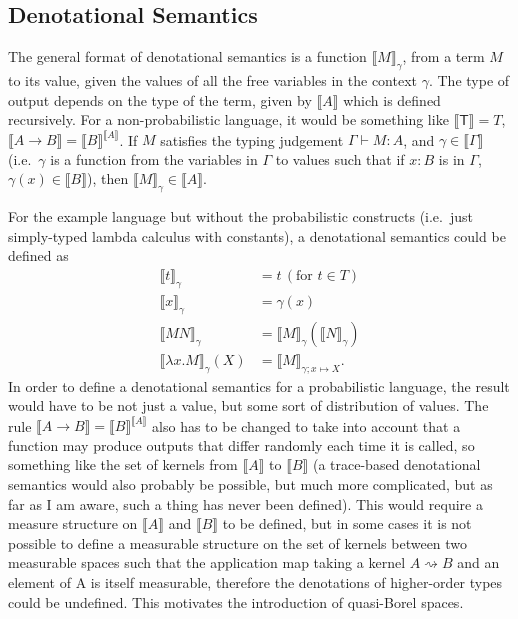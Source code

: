 \documentclass[titlepage]{article}
\newcommand{\denotation}[1]{\llbracket #1 \rrbracket}
\begin{document}
\subsection{Denotational Semantics}
The general format of denotational semantics is a function $\denotation M_\gamma$, from a term $M$ to its value, given the values of all the free variables in the context $\gamma$. The type of output depends on the type of the term, given by $\denotation A$ which is defined recursively. For a non-probabilistic language, it would be something like $\denotation{\mathsf T} = T$, $\denotation{A \to B} = \denotation B^{\denotation A}$. If $M$ satisfies the typing judgement $\Gamma \vdash M : A$, and $\gamma \in \denotation \Gamma$ (i.e.~$\gamma$ is a function from the variables in $\Gamma$ to values such that if $x:B$ is in $\Gamma$, $\gamma (x) \in \denotation B$), then $\denotation M_\gamma \in \denotation A$.

For the example language but without the probabilistic constructs (i.e.~just simply-typed lambda calculus with constants), a denotational semantics could be defined as
\begin{align*}
\denotation t_\gamma & = t\,(\text{for }t \in T) \\
\denotation x_\gamma & = \gamma(x) \\
\denotation{M N}_\gamma & = \denotation M_\gamma(\denotation N_\gamma) \\
\denotation{\lambda x. M }_\gamma(X) & = \denotation M_{\gamma ; x \mapsto X}.
\end{align*}
In order to define a denotational semantics for a probabilistic language, the result would have to be not just a value, but some sort of distribution of values. The rule $\denotation{A \to B} = \denotation B^{\denotation A}$ also has to be changed to take into account that a function may produce outputs that differ randomly each time it is called, so something like the set of kernels from $\denotation A$ to $\denotation B$ (a trace-based denotational semantics would also probably be possible, but much more complicated, but as far as I am aware, such a thing has never been defined). This would require a measure structure on $\denotation A$ and $\denotation B$ to be defined, but in some cases it is not possible to define a measurable structure on the set of kernels between two measurable spaces such that the application map taking a kernel $A \rightsquigarrow B$ and an element of A is itself measurable, therefore the denotations of higher-order types could be undefined. This motivates the introduction of quasi-Borel spaces.
\end{document}

